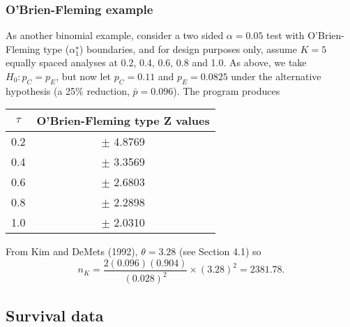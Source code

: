 \subsubsection{O'Brien-Fleming example}

As another binomial example, consider a two sided $\alpha = 0.05$ test with
O'Brien-Fleming type ($\alpha_1^{\star}$) boundaries, and for design
purposes only, assume $K=5$ equally spaced analyses at 0.2, 0.4, 0.6, 0.8
and 1.0.  As above, we take $H_0: p_C = p_E$, but now let $p_C = 0.11$ and
$p_E = 0.0825$ under the alternative hypothesis (a 25\% reduction,
$\bar p = 0.096$).  The program produces
\begin{center}
\begin{tabular}{cc} \hline
\multicolumn{1}{c}{$\tau$}&
\multicolumn{1}{c}{O'Brien-Fleming type Z values} \\ \hline
 0.2 & $\pm$ 4.8769  \\
 0.4 & $\pm$ 3.3569  \\
 0.6 & $\pm$ 2.6803  \\
 0.8 & $\pm$ 2.2898  \\
 1.0 & $\pm$ 2.0310  \\
\hline
\end{tabular}
\end{center}
From Kim and DeMets (1992), $\theta = 3.28$ (see Section 4.1) so
\begin{displaymath}
  n_K = \frac{2  (0.096) (0.904)}{(0.028)^2} \times (3.28)^2 = 2381.78.
\end{displaymath}


\subsection{Survival data}

